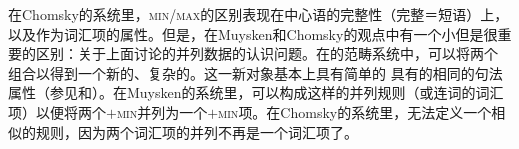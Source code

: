 在Chomsky的系统里，\textsc{min}/\textsc{max}的区别表现在中心语的完整性（完整＝短语）上，以及作为词汇项的属性。但是，在Muysken和Chomsky的观点中有一个小但是很重要的区别：关于上面讨论的并列数据的认识问题。在\xbartc 的范畴系统中，可以将两个\xzeroc{} 组合以得到一个新的、复杂的\xzeroc。这一新对象基本上具有简单的\xzeroc{} 具有的相同的句法属性（参见\citet[]{Jackendoff77a}和\citet*{GKPS85a}）。在Muysken的系统里，可以构成这样的并列规则（或连词的词汇项）以便将两个$+$\textsc{min}并列为一个$+$\textsc{min}项。在Chomsky的系统里，无法定义一个相似的规则，因为两个词汇项的并列不再是一个词汇项了。

